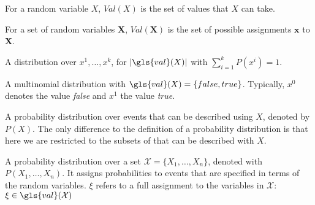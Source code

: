 {%
  For a \gls{random variable} $X$, $Val(X)$ is the set of values that $X$ can take.

  For a \gls{set of random variables} $\bm{X}$, $Val(\bm{X})$ is the set of possible assignments $\bm{x}$ to $\bm{X}$.
}

{%
  A distribution over $x^1,\ldots,x^k$, for $\lvert\gls{val}(X)\rvert$ with $\sum_{i=1}^k P(x^i)=1$.
}

{%
  A \gls{multinomial distribution} with $\gls{val}(X)=\{false,true\}$. Typically, $x^0$ denotes the value \textit{false} and $x^1$ the value \textit{true}.
}

{%
  A \gls{probability distribution} over events that can be described using $X$, denoted by $P(X)$. The only difference to the definition of a \gls{probability distribution} is that here we are restricted to the subsets of  that can be described with $X$.
}

{%
  A \gls{probability distribution} over a set $\mathcal{X}=\{X_1,\ldots,X_n\}$, denoted with $P(X_1,\ldots,X_n)$. It assigns probabilities to events that are specified in terms of the \glspl{random variable}. $\xi$ refers to a full assignment to the variables in $\mathcal{X}$: $\xi\in\gls{val}(\mathcal{X})$


}

